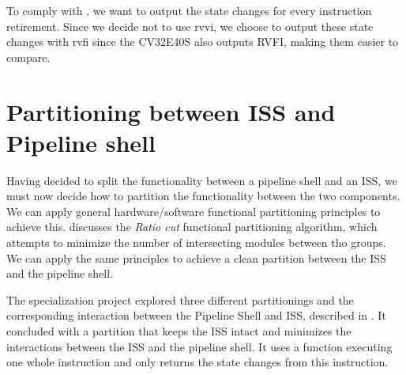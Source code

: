 To comply with , we want to output the state changes for every instruction retirement. Since we decide not to use \acrshort{rvvi}, we choose to output these state changes with \acrshort{rvfi} since the CV32E40S also outputs RVFI, making them easier to compare.

%


\section{Partitioning between ISS and Pipeline shell}

Having decided to split the functionality between a pipeline shell and an ISS, we must now decide how to partition the functionality between the two components. We can apply general hardware/software functional partitioning principles to achieve this. 
\textcite{gajskiSpecificationDesignEmbedded1994} discusses the \textit{Ratio cut} functional partitioning algorithm, which attempts to minimize the number of intersecting modules between tho groups. We can apply the same principles to achieve a clean partition between the ISS and the pipeline shell.

The specialization project explored three different partitionings and the corresponding interaction between the Pipeline Shell and ISS, described in . It concluded with a partition that keeps the ISS intact and minimizes the interactions between the ISS and the pipeline shell. It uses a  function executing one whole instruction and only returns the state changes from this instruction.

